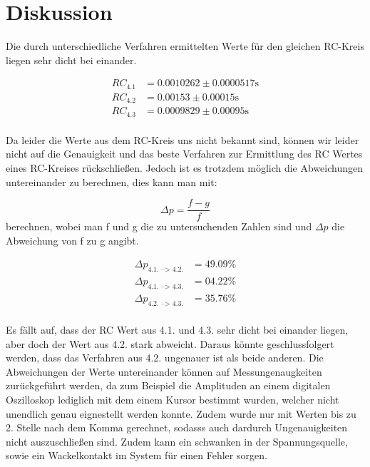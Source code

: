 \section{Diskussion}
\label{sec:Diskussion}
Die durch unterschiedliche Verfahren ermittelten Werte für den gleichen RC-Kreis liegen sehr dicht bei einander. 

\begin{align*}
    RC_\text{4.1} &= 0.0010262 \pm 0.0000517 \si{\second}\\
    RC_\text{4.2} &= 0.00153 \pm 0.00015 \si{\second}\\
    RC_\text{4.3} &= 0.0009829 \pm 0.00095 \si{\second}\\
\end{align*}

\noindent
Da leider die Werte aus dem RC-Kreis uns nicht bekannt sind, können wir leider
nicht auf die Genauigkeit und das beste Verfahren zur Ermittlung des RC Wertes eines RC-Kreises rückschließen. Jedoch ist es trotzdem möglich die Abweichungen untereinander zu berechnen,
dies kann man mit:

\begin{equation*}
\Delta p = \frac{f-g}{f}
\end{equation*}
\noindent
berechnen, wobei man f und g die zu untersuchenden Zahlen sind und $\Delta p$ die Abweichung von f zu g angibt.

\begin{align*}
    \Delta p_\text{4.1. --> 4.2.} &= 49.09\% \\
    \Delta p_\text{4.1. --> 4.3.} &= 04.22\% \\
    \Delta p_\text{4.2. --> 4.3.} &= 35.76\% \\
\end{align*}


\noindent
Es fällt auf, dass der RC Wert aus 4.1. und 4.3. sehr dicht bei einander liegen, aber doch der Wert aus 4.2. stark abweicht. Daraus könnte geschlussfolgert werden, dass das Verfahren aus
4.2. ungenauer ist als beide anderen.
\noindent
Die Abweichungen der Werte untereinander können auf Messungenaugkeiten zurückgeführt werden, da zum Beispiel die Amplituden an einem digitalen Oszilloskop lediglich mit dem einem Kursor 
bestimmt wurden, welcher nicht unendlich genau eignestellt werden konnte. Zudem wurde nur mit Werten bis zu 2. Stelle nach dem Komma gerechnet, sodasss auch dardurch Ungenauigkeiten nicht auszuschließen sind.
Zudem kann ein schwanken in der Spannungsquelle, sowie ein Wackelkontakt im System für einen Fehler sorgen.